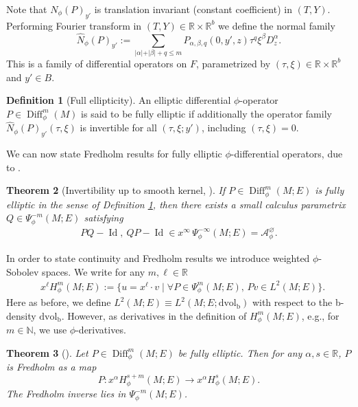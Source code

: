 \documentclass[11pt]{article}
\newcommand{\eg}{e.g.,\xspace}
\newcommand{\skpt}{\smallskip}
\numberwithin{equation}{section}
\theoremstyle{plain}
\newtheorem{Th}{Theorem}[section]
\theoremstyle{definition}
\newtheorem{defn}[Th]{Definition}
\newcommand {\N}{\mathbb{N}}
\newcommand{\R}{{\mathbb{R}}}
\newcommand\calA{{\mathcal A}}
\newcommand{\bb}{{\mathrm{b}}}
\newcommand{\dvol}{\mathrm{dvol}}
\DeclareMathOperator{\Diff}{Diff}
\DeclareMathOperator{\Id}{Id}
\begin{document}
Note that $N_{\phi}(P)_{y'}$ is translation invariant (constant coefficient) in $(T,Y)$.
Performing Fourier transform in $(T,Y) \in \R \times \R^b$ we define the normal family
\begin{equation}\label{normal-family}
\widehat{N}_{\phi}(P)_{y'} :=
\sum_{\vert \alpha \vert + \vert \beta \vert + q \leq m}
P_{\alpha,\beta,q}(0,y',z) \tau^q \xi^\beta D_{z}^{\alpha}.
\end{equation}
This is a family of differential operators on $F$, parametrized by
$(\tau, \xi) \in \R \times \R^b$ and $y'\in B$.
\begin{defn}[Full ellipticity] \label{full ellipticity}
An elliptic differential $\phi$-operator $P \in \Diff_{\phi}^{m}(M)$ is said to be fully elliptic
if additionally the operator family $\widehat{N}_{\phi}(P)_{y'}(\tau, \xi)$
is invertible for all $(\tau, \xi; y')$, including $(\tau, \xi) = 0$.
\end{defn}

We can now state Fredholm results for fully elliptic $\phi$-differential
operators, due to \cite{mazzeo1998pseudodifferential}.

\skpt
\begin{Th}[Invertibility up to smooth kernel, {\cite[Prop.\,8]{mazzeo1998pseudodifferential}}]
\label{invphi}
If $ P \in\Diff^{m}_{\phi}(M; E)$ is fully elliptic
in the sense of Definition \ref{full ellipticity}, then there exists a small calculus parametrix $Q \in \Psi_{\phi}^{-m}(M;E)$
satisfying
\begin{align*}
P Q - \Id,\ Q P - \Id \in x^\infty\,\Psi_\phi^{-\infty}(M;E) = \calA_\phi^\varnothing.
\end{align*}
\end{Th}

In order to state continuity and Fredholm results we introduce weighted $\phi$-Sobolev spaces. We write
for any $m, \ell \in \R$
\begin{align*}
&x^{\ell}H^{m}_{\phi}(M;E) := \{ u = x^{\ell} \cdot v \mid \forall P \in \Psi_{\phi}^{m}(M;E),\,Pv \in L^{2}(M;E) \}.
\end{align*}
Here as before, we define $L^2(M;E) \equiv L^2(M; E; \dvol_\bb)$ with respect to the b-density $\dvol_\bb$. However, as derivatives in the definition of $H^m_\phi(M;E)$, \eg for $m\in\N$, we use $\phi$-derivatives.

\begin{Th}[{\cite[Prop.\,9,\,10]{mazzeo1998pseudodifferential}}]
Let $P\in \Diff^m_\phi(M; E)$ be fully elliptic. Then for any $\alpha, s\in\R$, $P$ is Fredholm as a map
\[
P: x^\alpha H^{s+m}_\phi(M; E) \to x^{\alpha}H^{s}_\phi(M; E).
\]
The Fredholm inverse lies in $\Psi_{\phi}^{-m}(M;E)$.
\end{Th}
\end{document}

